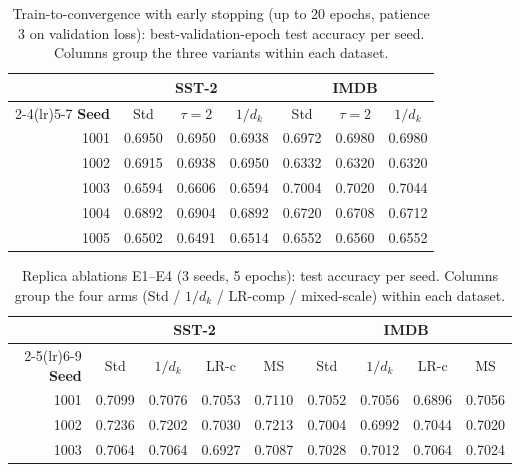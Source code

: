 \documentclass[10pt,a4paper]{article}
\newcommand{\dk}{d_k}
\begin{document}
\begin{table}[H]
  \centering
  \caption{Train-to-convergence with early stopping (up to 20 epochs, patience
  3 on validation loss): best-validation-epoch test accuracy per seed. Columns
  group the three variants within each dataset.}
  \small
  \begin{tabular}{r ccc ccc}
    \toprule
    & \multicolumn{3}{c}{SST-2} & \multicolumn{3}{c}{IMDB} \\
    \cmidrule(lr){2-4}\cmidrule(lr){5-7}
    \textbf{Seed} & Std & $\tau{=}2$ & $1/\dk$ & Std & $\tau{=}2$ & $1/\dk$ \\
    \midrule
1001 & 0.6950 & 0.6950 & 0.6938 & 0.6972 & 0.6980 & 0.6980 \\
1002 & 0.6915 & 0.6938 & 0.6950 & 0.6332 & 0.6320 & 0.6320 \\
1003 & 0.6594 & 0.6606 & 0.6594 & 0.7004 & 0.7020 & 0.7044 \\
1004 & 0.6892 & 0.6904 & 0.6892 & 0.6720 & 0.6708 & 0.6712 \\
1005 & 0.6502 & 0.6491 & 0.6514 & 0.6552 & 0.6560 & 0.6552 \\
    \bottomrule
  \end{tabular}
\end{table}

\begin{table}[H]
  \centering
  \caption{Replica ablations E1--E4 (3 seeds, 5 epochs): test accuracy per
  seed. Columns group the four arms (Std / $1/\dk$ / LR-comp / mixed-scale)
  within each dataset.}
  \small
  \begin{tabular}{r cccc cccc}
    \toprule
    & \multicolumn{4}{c}{SST-2} & \multicolumn{4}{c}{IMDB} \\
    \cmidrule(lr){2-5}\cmidrule(lr){6-9}
    \textbf{Seed} & Std & $1/\dk$ & LR-c & MS & Std & $1/\dk$ & LR-c & MS \\
    \midrule
1001 & 0.7099 & 0.7076 & 0.7053 & 0.7110 & 0.7052 & 0.7056 & 0.6896 & 0.7056 \\
1002 & 0.7236 & 0.7202 & 0.7030 & 0.7213 & 0.7004 & 0.6992 & 0.7044 & 0.7020 \\
1003 & 0.7064 & 0.7064 & 0.6927 & 0.7087 & 0.7028 & 0.7012 & 0.7064 & 0.7024 \\
    \bottomrule
  \end{tabular}
\end{table}
\end{document}

